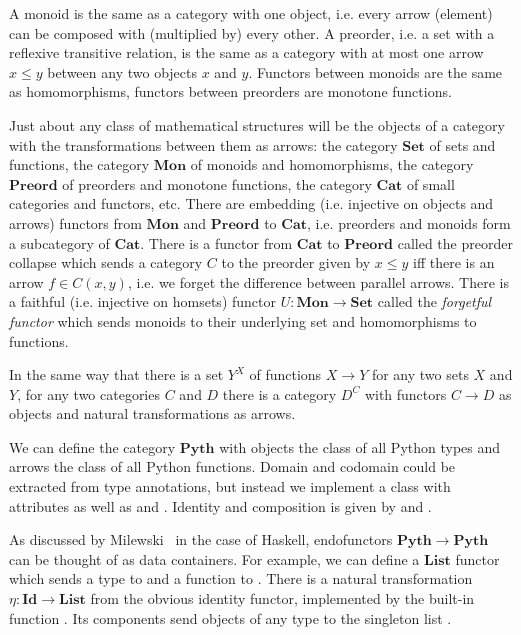 \begin{example}
A monoid is the same as a category with one object, i.e. every arrow (element) can be composed with (multiplied by) every other.
A preorder, i.e. a set with a reflexive transitive relation, is the same as a category with at most one arrow $x \leq y$ between any two objects $x$ and $y$.
Functors between monoids are the same as homomorphisms, functors between preorders are monotone functions.
\end{example}

\begin{example}
Just about any class of mathematical structures will be the objects of a category with the transformations between them as arrows: the category $\mathbf{Set}$ of sets and functions, the category $\mathbf{Mon}$ of monoids and homomorphisms, the category $\mathbf{Preord}$ of preorders and monotone functions, the category $\mathbf{Cat}$ of small categories and functors, etc.
There are embedding (i.e. injective on objects and arrows) functors from $\mathbf{Mon}$ and $\mathbf{Preord}$ to $\mathbf{Cat}$, i.e. preorders and monoids form a subcategory of $\mathbf{Cat}$.
There is a functor from $\mathbf{Cat}$ to $\mathbf{Preord}$ called the preorder collapse which sends a category $C$ to the preorder given by $x \leq y$ iff there is an arrow $f \in C(x, y)$, i.e. we forget the difference between parallel arrows.
There is a faithful (i.e. injective on homsets) functor $U : \mathbf{Mon} \to \mathbf{Set}$ called the \emph{forgetful functor} which sends monoids to their underlying set and homomorphisms to functions.
\end{example}

\begin{example}
In the same way that there is a set $Y^X$ of functions $X \to Y$ for any two sets $X$ and $Y$, for any two categories $C$ and $D$ there is a category $D^C$ with functors $C \to D$ as objects and natural transformations as arrows.
\end{example}

\begin{example}\label{ex:python categories}
We can define the category $\mathbf{Pyth}$ with objects the class of all Python types and arrows the class of all Python functions.
Domain and codomain could be extracted from type annotations, but instead we implement a class  with attributes  as well as  and .
Identity and composition is given by  and   .

As discussed by Milewski~\cite{Milewski14} in the case of Haskell, endofunctors $\mathbf{Pyth} \to \mathbf{Pyth}$ can be thought of as data containers.
For example, we can define a $\mathbf{List}$ functor which sends a type  to  and a function  to .
There is a natural transformation $\eta : \mathbf{Id} \to \mathbf{List}$ from the obvious identity functor, implemented by the built-in function .
Its components send objects  of any type  to the singleton list .
\end{example}

